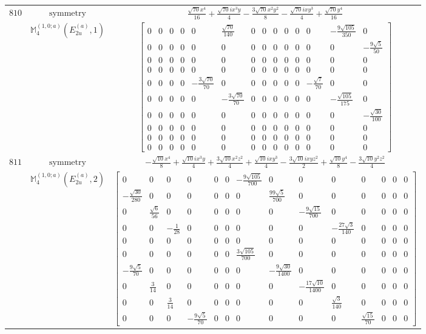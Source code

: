 \documentclass[fleqn,8pt,landscape]{jsarticle}
\begin{document}
\begin{longtable}{ccc}
$ 810 $ & $ \text{symmetry} $ & $ \frac{\sqrt{70} x^{4}}{16} + \frac{\sqrt{70} i x^{3} y}{4} - \frac{3 \sqrt{70} x^{2} y^{2}}{8} - \frac{\sqrt{70} i x y^{3}}{4} + \frac{\sqrt{70} y^{4}}{16} $ \\
$  $ & $ \mathbb{M}_{4}^{(1,0;a)}(E_{2u}^{(a)},1) $ & $ \begin{bmatrix} 0 & 0 & 0 & 0 & 0 & \frac{\sqrt{70}}{140} & 0 & 0 & 0 & 0 & 0 & 0 & - \frac{9 \sqrt{105}}{350} & 0 \\ 0 & 0 & 0 & 0 & 0 & 0 & 0 & 0 & 0 & 0 & 0 & 0 & 0 & - \frac{9 \sqrt{5}}{50} \\ 0 & 0 & 0 & 0 & 0 & 0 & 0 & 0 & 0 & 0 & 0 & 0 & 0 & 0 \\ 0 & 0 & 0 & 0 & 0 & 0 & 0 & 0 & 0 & 0 & 0 & 0 & 0 & 0 \\ 0 & 0 & 0 & 0 & - \frac{3 \sqrt{70}}{70} & 0 & 0 & 0 & 0 & 0 & 0 & - \frac{\sqrt{7}}{70} & 0 & 0 \\ 0 & 0 & 0 & 0 & 0 & - \frac{3 \sqrt{70}}{70} & 0 & 0 & 0 & 0 & 0 & 0 & - \frac{\sqrt{105}}{175} & 0 \\ 0 & 0 & 0 & 0 & 0 & 0 & 0 & 0 & 0 & 0 & 0 & 0 & 0 & - \frac{\sqrt{30}}{100} \\ 0 & 0 & 0 & 0 & 0 & 0 & 0 & 0 & 0 & 0 & 0 & 0 & 0 & 0 \\ 0 & 0 & 0 & 0 & 0 & 0 & 0 & 0 & 0 & 0 & 0 & 0 & 0 & 0 \\ 0 & 0 & 0 & 0 & 0 & 0 & 0 & 0 & 0 & 0 & 0 & 0 & 0 & 0 \end{bmatrix} $ \\ \hline
$ 811 $ & $ \text{symmetry} $ & $ - \frac{\sqrt{10} x^{4}}{8} + \frac{\sqrt{10} i x^{3} y}{4} + \frac{3 \sqrt{10} x^{2} z^{2}}{4} + \frac{\sqrt{10} i x y^{3}}{4} - \frac{3 \sqrt{10} i x y z^{2}}{2} + \frac{\sqrt{10} y^{4}}{8} - \frac{3 \sqrt{10} y^{2} z^{2}}{4} $ \\
$  $ & $ \mathbb{M}_{4}^{(1,0;a)}(E_{2u}^{(a)},2) $ & $ \begin{bmatrix} 0 & 0 & 0 & 0 & 0 & 0 & - \frac{9 \sqrt{105}}{700} & 0 & 0 & 0 & 0 & 0 & 0 & 0 \\ - \frac{\sqrt{30}}{280} & 0 & 0 & 0 & 0 & 0 & 0 & \frac{99 \sqrt{5}}{700} & 0 & 0 & 0 & 0 & 0 & 0 \\ 0 & \frac{\sqrt{6}}{56} & 0 & 0 & 0 & 0 & 0 & 0 & - \frac{9 \sqrt{15}}{700} & 0 & 0 & 0 & 0 & 0 \\ 0 & 0 & - \frac{1}{28} & 0 & 0 & 0 & 0 & 0 & 0 & - \frac{27 \sqrt{3}}{140} & 0 & 0 & 0 & 0 \\ 0 & 0 & 0 & 0 & 0 & 0 & 0 & 0 & 0 & 0 & 0 & 0 & 0 & 0 \\ 0 & 0 & 0 & 0 & 0 & 0 & \frac{3 \sqrt{105}}{700} & 0 & 0 & 0 & 0 & 0 & 0 & 0 \\ - \frac{9 \sqrt{5}}{70} & 0 & 0 & 0 & 0 & 0 & 0 & - \frac{9 \sqrt{30}}{1400} & 0 & 0 & 0 & 0 & 0 & 0 \\ 0 & \frac{3}{14} & 0 & 0 & 0 & 0 & 0 & 0 & - \frac{17 \sqrt{10}}{1400} & 0 & 0 & 0 & 0 & 0 \\ 0 & 0 & \frac{3}{14} & 0 & 0 & 0 & 0 & 0 & 0 & \frac{\sqrt{3}}{140} & 0 & 0 & 0 & 0 \\ 0 & 0 & 0 & - \frac{9 \sqrt{5}}{70} & 0 & 0 & 0 & 0 & 0 & 0 & \frac{\sqrt{15}}{70} & 0 & 0 & 0 \end{bmatrix} $ \\ \hline

\end{longtable}
\end{document}
